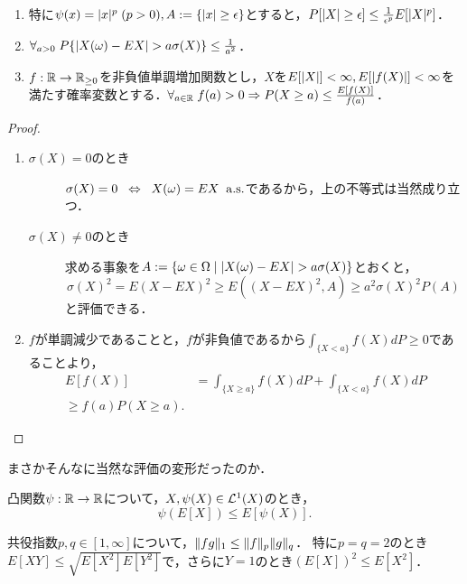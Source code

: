 \documentclass[uplatex,dvipdfmx]{jsreport}
\begin{document}
\begin{corollary}\mbox{}
    \begin{enumerate}
        \item 特に$\psi(x)=\lvert x\rvert^p\;(p>0),A:=\left\{\lvert x\rvert\ge\epsilon\right\}$とすると，$P[\lvert X\rvert\ge\epsilon]\le\frac{1}{\epsilon^p}E[\lvert X\rvert^p]$．
        \item $\forall_{a>0}\;P\{\lvert X(\omega)-EX\rvert>a\sigma(X)\}\le\frac{1}{a^2}$．
        \item $f:\mathbb{R}\to\mathbb{R}_{\ge 0}$を非負値単調増加関数とし，$X$を$E[\lvert X\rvert]<\infty,E[\lvert f(X)\rvert]<\infty$を満たす確率変数とする．$\forall_{a\in\mathbb{R}}\;f(a)>0\Rightarrow P(X\ge a)\le\frac{E[f(X)]}{f(a)}$．
    \end{enumerate}
\end{corollary}
\begin{proof}\mbox{}
    \begin{enumerate}
        \item 
    \begin{description}
        \item[$\sigma(X)=0$のとき] $\sigma(X)=0\;\;\Leftrightarrow\;\; X(\omega)=EX\;\;\mathrm{a.s.}$であるから，上の不等式は当然成り立つ．
        \item[$\sigma(X)\ne0$のとき] 求める事象を$A:=\left\{\omega\in\Omega\mid\lvert X(\omega)-EX\rvert>a\sigma(X)\right\}$とおくと，
        \[\sigma(X)^2=E(X-EX)^2\ge E((X-EX)^2,A)\ge a^2\sigma(X)^2P(A)\]
        と評価できる．
    \end{description}
        \item $f$が単調減少であることと，$f$が非負値であるから$\int_{\{X<a\}}f(X)dP\ge 0$であることより，
        \begin{align*}
            E[f(X)]&=\int_{\{X\ge a\}}f(X)dP+\int_{\{X< a\}}f(X)dP\\
            \ge f(a)P(X\ge a).
        \end{align*}
    \end{enumerate}
\end{proof}
\begin{remarks}
    まさかそんなに当然な評価の変形だったのか．
\end{remarks}

\begin{lemma}
    凸関数$\psi:\mathbb{R}\to\mathbb{R}$について，$X,\psi(X)\in\mathcal{L}^1(X)$のとき，
    \[\psi(E[X])\le E[\psi(X)].\]
\end{lemma}

\begin{lemma}
    共役指数$p,q\in[1,\infty]$について，$\|fg\|_1\le\|f\|_p\|g\|_q$．
    特に$p=q=2$のとき$E[XY]\le\sqrt{E[X^2]E[Y^2]}$で，さらに$Y=1$のとき$(E[X])^2\le E[X^2]$．
\end{lemma}
\end{document}
